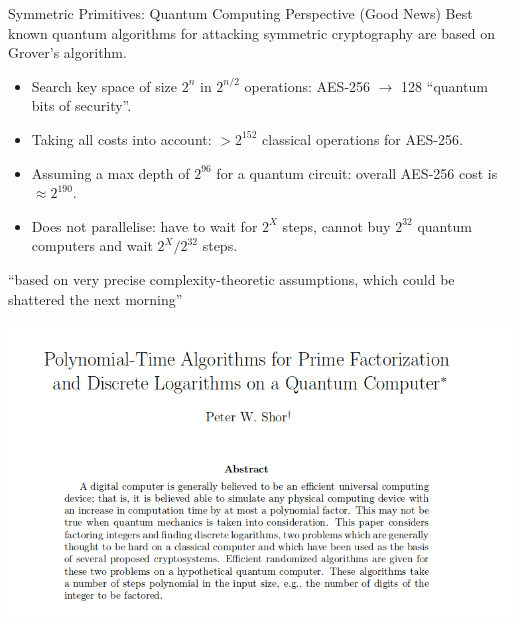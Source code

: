 \documentclass[xcolor=table,10pt,aspectratio=169]{beamer}
\begin{document}
\begin{frame}[label={sec:orgc687bec}]{Symmetric Primitives: Quantum Computing Perspective (Good News)}
Best known quantum algorithms for attacking symmetric cryptography are based on Grover’s algorithm. 

\begin{itemize}
\item Search key space of size \(2^n\) in \(2^{n/2}\) operations: AES-256 \(\rightarrow\) 128 “quantum bits of security”.
\item Taking all costs into account: \(> 2^{152}\) classical operations for AES-256.
\item Assuming a max depth of \(2^{96}\) for a quantum circuit: overall AES-256 cost is \(\approx 2^{190}\).
\item Does not parallelise: have to wait for \(2^{X}\) steps, cannot buy \(2^{32}\) quantum computers and wait \(2^X / 2^{32}\) steps.
\end{itemize}
\end{frame}
\begin{frame}[label={sec:org1caa80b}]{``based on very precise complexity-theoretic assumptions, which could be shattered the next morning''}
\begin{center}
\includegraphics[keepaspectratio,height=.8\textheight]{./lecture-assumptions-shor-paper.png}
\end{center}
\end{frame}
\end{document}
